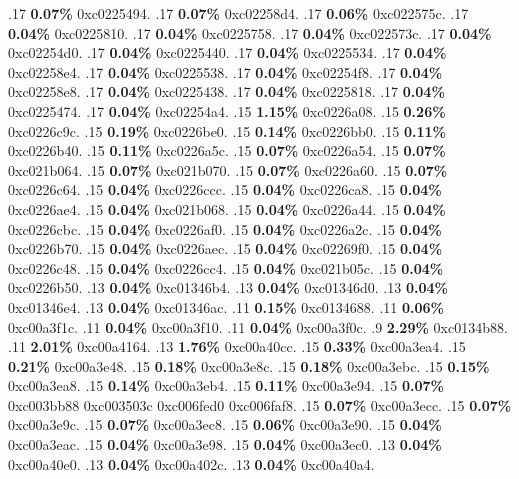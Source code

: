 \begin{profile}
{.17 \textbf{0.07\%} 0xc0225494. 
.17 \textbf{0.07\%} 0xc02258d4. 
.17 \textbf{0.06\%} 0xc022575c. 
.17 \textbf{0.04\%} 0xc0225810. 
.17 \textbf{0.04\%} 0xc0225758. 
.17 \textbf{0.04\%} 0xc022573c. 
.17 \textbf{0.04\%} 0xc02254d0. 
.17 \textbf{0.04\%} 0xc0225440. 
.17 \textbf{0.04\%} 0xc0225534. 
.17 \textbf{0.04\%} 0xc02258e4. 
.17 \textbf{0.04\%} 0xc0225538. 
.17 \textbf{0.04\%} 0xc02254f8. 
.17 \textbf{0.04\%} 0xc02258e8. 
.17 \textbf{0.04\%} 0xc0225438. 
.17 \textbf{0.04\%} 0xc0225818. 
.17 \textbf{0.04\%} 0xc0225474. 
.17 \textbf{0.04\%} 0xc02254a4. 
.15 \textbf{1.15\%} 0xc0226a08. 
.15 \textbf{0.26\%} 0xc0226c9c. 
.15 \textbf{0.19\%} 0xc0226be0. 
.15 \textbf{0.14\%} 0xc0226bb0. 
.15 \textbf{0.11\%} 0xc0226b40. 
.15 \textbf{0.11\%} 0xc0226a5c. 
.15 \textbf{0.07\%} 0xc0226a54. 
.15 \textbf{0.07\%} 0xc021b064. 
.15 \textbf{0.07\%} 0xc021b070. 
.15 \textbf{0.07\%} 0xc0226a60. 
.15 \textbf{0.07\%} 0xc0226c64. 
.15 \textbf{0.04\%} 0xc0226ccc. 
.15 \textbf{0.04\%} 0xc0226ca8. 
.15 \textbf{0.04\%} 0xc0226ae4. 
.15 \textbf{0.04\%} 0xc021b068. 
.15 \textbf{0.04\%} 0xc0226a44. 
.15 \textbf{0.04\%} 0xc0226cbc. 
.15 \textbf{0.04\%} 0xc0226af0. 
.15 \textbf{0.04\%} 0xc0226a2c. 
.15 \textbf{0.04\%} 0xc0226b70. 
.15 \textbf{0.04\%} 0xc0226aec. 
.15 \textbf{0.04\%} 0xc02269f0. 
.15 \textbf{0.04\%} 0xc0226c48. 
.15 \textbf{0.04\%} 0xc0226cc4. 
.15 \textbf{0.04\%} 0xc021b05c. 
.15 \textbf{0.04\%} 0xc0226b50. 
.13 \textbf{0.04\%} 0xc01346b4. 
.13 \textbf{0.04\%} 0xc01346d0. 
.13 \textbf{0.04\%} 0xc01346e4. 
.13 \textbf{0.04\%} 0xc01346ac. 
.11 \textbf{0.15\%} 0xc0134688. 
.11 \textbf{0.06\%} 0xc00a3f1c. 
.11 \textbf{0.04\%} 0xc00a3f10. 
.11 \textbf{0.04\%} 0xc00a3f0c. 
.9 \textbf{2.29\%} 0xc0134b88. 
.11 \textbf{2.01\%} 0xc00a4164. 
.13 \textbf{1.76\%} 0xc00a40cc. 
.15 \textbf{0.33\%} 0xc00a3ea4. 
.15 \textbf{0.21\%} 0xc00a3e48. 
.15 \textbf{0.18\%} 0xc00a3e8c. 
.15 \textbf{0.18\%} 0xc00a3ebc. 
.15 \textbf{0.15\%} 0xc00a3ea8. 
.15 \textbf{0.14\%} 0xc00a3eb4. 
.15 \textbf{0.11\%} 0xc00a3e94. 
.15 \textbf{0.07\%} 0xc003bb88\newline {} 0xc003503c\newline {} 0xc006fed0\newline {} 0xc006faf8. 
.15 \textbf{0.07\%} 0xc00a3ecc. 
.15 \textbf{0.07\%} 0xc00a3e9c. 
.15 \textbf{0.07\%} 0xc00a3ec8. 
.15 \textbf{0.06\%} 0xc00a3e90. 
.15 \textbf{0.04\%} 0xc00a3eac. 
.15 \textbf{0.04\%} 0xc00a3e98. 
.15 \textbf{0.04\%} 0xc00a3ec0. 
.13 \textbf{0.04\%} 0xc00a40e0. 
.13 \textbf{0.04\%} 0xc00a402c. 
.13 \textbf{0.04\%} 0xc00a40a4. 
}
\end{profile}

